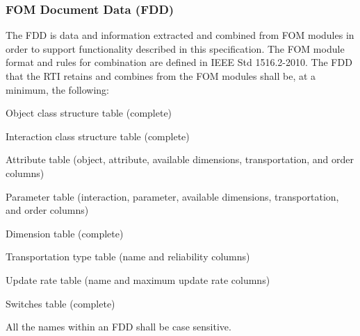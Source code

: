 \clearpage

\vspace*{-1.44pt}
\par\vspace{4pt}
\begin{center}
    \makebox[\linewidth][c]{\hspace*{2.32pt}\resizebox{443.10pt}{!}{}}\par
\end{center}
\vspace{-23.02pt}

\subsubsection{FOM Document Data (FDD)}

The FDD is data and information extracted and combined from FOM modules in order to support functionality described in this specification. The FOM module format and rules for combination are defined in IEEE Std 1516.2-2010. The FDD that the RTI retains and combines from the FOM modules shall be, at a minimum, the following:

\begin{stddashlist}
    \item Object class structure table (complete)
    \item Interaction class structure table (complete)
    \item Attribute table (object, attribute, available dimensions, transportation, and order columns)
    \item Parameter table (interaction, parameter, available dimensions, transportation, and order columns)
    \item Dimension table (complete)
    \item Transportation type table (name and reliability columns)
    \item Update rate table (name and maximum update rate columns)
    \item Switches table (complete)
\end{stddashlist}

All the names within an FDD shall be case sensitive.

